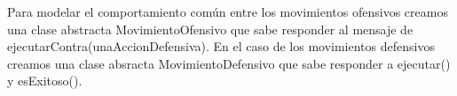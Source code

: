 Para modelar el comportamiento común entre los movimientos ofensivos creamos una clase abstracta MovimientoOfensivo que sabe responder al mensaje de ejecutarContra(unaAccionDefensiva). En el caso de los movimientos defensivos creamos una clase absracta MovimientoDefensivo que sabe responder a ejecutar() y esExitoso(). 
